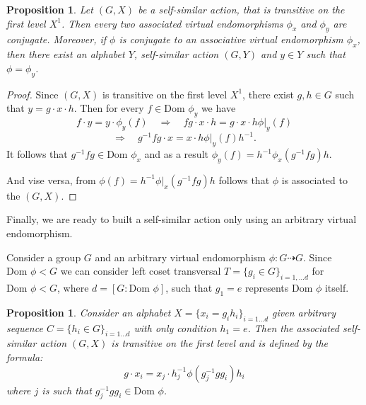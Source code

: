 \documentclass[a4paper,12pt]{amsart}
\newtheorem{proposition}[theorem]{Proposition}
\theoremstyle{definition}
\newcommand{\Dom}{\text{Dom }}
\begin{document}
	
	\begin{proposition}\label{virtual_end:conjugate}
		Let $(G, X)$ be a self-similar action, that is transitive on the first level $X^{1}$. Then every two associated virtual endomorphisms $\phi_x$ and $\phi_y$ are conjugate. Moreover, if $\phi$ is conjugate to an associative virtual endomorphism $\phi_x$, then there exist an alphabet $Y$, self-similar action $(G, Y)$ and $y \in Y$ such that $\phi = \phi_y$. 
	\end{proposition}

	\begin{proof}
		Since $(G, X)$ is transitive on the first level $X^{1}$, there exist $g, h \in G$ such that $y = g \cdot x \cdot h$. Then for every $f \in \Dom \phi_y$ we have 
		$$
		f \cdot y = y \cdot \phi_y(f) 
		\quad \Rightarrow \quad 
		f g \cdot x \cdot h = g \cdot x \cdot h \phi|_y (f)
		$$
		$$
		\Rightarrow \quad  g^{-1} fg \cdot x = x \cdot h \phi|_y(f) h^{-1}.
		$$
		It follows that $g^{-1} f g \in \Dom \phi_x$ and as a result $\phi_y(f) = h^{-1}\phi_x(g^{-1}fg)h$. 
		
		
		
		And vise versa, from $\phi(f) = h^{-1}\phi|_x(g^{-1}fg)h$ follows that $\phi$ is associated to the $(G, X)$.
	\end{proof}
	
	
	Finally, we are ready to built a self-similar action only using an arbitrary virtual endomorphism. 
	
	Consider a group $G$ and an arbitrary virtual endomorphism $\phi : G \dashrightarrow G$. Since $\Dom \phi < G$ we can consider left coset transversal $T = \{g_i \in G\}_{i = 1, \dots d}$ for $ \Dom \phi < G$, where $d = [G : \Dom \phi]$, such that $g_1 = e$ represents $\Dom \phi$ itself. 
	
	
	
	\begin{proposition}
		Consider an alphabet $X = \{x_i = g_i h_i\}_{i = 1 \dots d}$ given arbitrary sequence $C = \{h_i \in G\}_{i = 1 \dots d}$ with only condition $h_1 = e$. Then the associated self-similar action $(G, X)$ is transitive on the first level and is defined by the formula: 
		\begin{equation}\label{eq:self-similar from virt}
			g \cdot x_i = x_j \cdot h^{-1}_j \phi(g_j^{-1} g g_i) h_i	
		\end{equation}
		where $j$ is such that $g^{-1}_j g g_i \in \Dom \phi$.
		
	\end{proposition}
	
\end{document}

